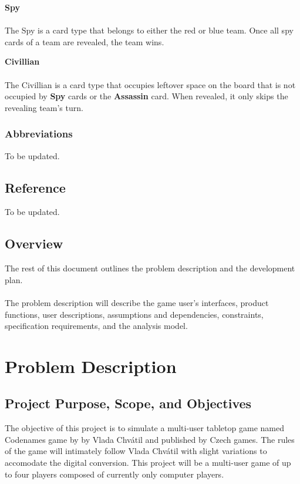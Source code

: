 \documentclass[10pt, a4paper]{article}
\begin{document}
		\textbf{Spy}\\
		\\
		The Spy is a card type that belongs to either the red or blue team. Once all spy cards of a team are revealed, the team wins.
		
		\textbf{Civillian}\\
		\\
		The Civillian is a card type that occupies leftover space on the board that is not occupied by \textbf{Spy} cards or the \textbf{Assassin} card. When revealed, it only skips the revealing team's turn. \\
	
		\subsubsection{Abbreviations}
		
		To be updated. \\
	
	\subsection{Reference}
	
	To be updated.\\
	
	\subsection{Overview}
	
	The rest of this document outlines the problem description and the development plan. \\ 
	\\  
	The problem description will describe the game user's interfaces, product functions, user descriptions, assumptions and dependencies, constraints, specification requirements, and the analysis model. \\  
	
	\newpage
	
\section{Problem Description}

	\subsection{Project Purpose, Scope, and Objectives}
	
	The objective of this project is to simulate a multi-user tabletop game named Codenames game by by Vlada Chv\'atil and published by Czech games. The rules of the game will intimately follow Vlada Chv\'atil with slight variations to accomodate the digital conversion. This project will be a multi-user game of up to four players composed of currently only computer players.\\
	
\end{document}
